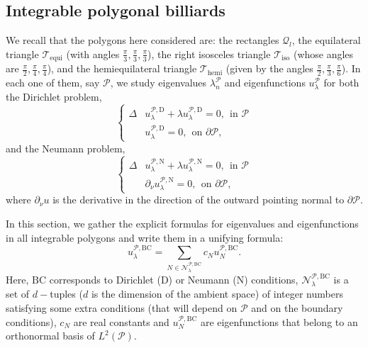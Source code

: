 \documentclass{amsart}
\theoremstyle{definition}
\theoremstyle{remark}
\newcommand{\pd}{\partial}
\numberwithin{equation}{section}
\theoremstyle{definition}
\theoremstyle{remark}
\begin{document}
\subsection{Integrable polygonal billiards}
We recall that the polygons here considered are: the rectangles $\mathcal{Q}_l$, the equilateral triangle $\mathcal{T}_{\mathrm{equi}}$ (with angles $\frac{\pi}{3},\frac{\pi}{3},\frac{\pi}{3}$), the right isosceles triangle $\mathcal{T}_\mathrm{iso}$ (whose angles are $\frac{\pi}{2},\frac{\pi}{4},\frac{\pi}{4}$), and the hemiequilateral triangle $\mathcal{T}_\mathrm{hemi}$ (given by the angles $\frac{\pi}{2},\frac{\pi}{3},\frac{\pi}{6}$). In each one of them, say $\mathcal{P}$, we study eigenvalues $	\lambda_n^\mathcal{P}$ and eigenfunctions $u_\lambda^\mathcal{P}$ for both the Dirichlet problem, \begin{equation}
	\left\{	\begin{aligned}
		\Delta &u_\lambda^{\mathcal{P},\mathrm{D}}+\lambda u_\lambda^{\mathcal{P},\mathrm{D}}=0, \ \ \text{in } \mathcal{P}\\
		&u_\lambda^{\mathcal{P},\mathrm{D}}=0,\ \ \text{on } \partial \mathcal{P},
	\end{aligned}\right.
\end{equation} and the Neumann problem,
\begin{equation}
	\left\{	\begin{aligned}
		\Delta &u_\lambda^{\mathcal{P},\mathrm{N}}+\lambda u_\lambda^{\mathcal{P},\mathrm{N}}=0, \ \ \text{in } \mathcal{P}\\
		&\partial_\nu u_\lambda^{\mathcal{P},\mathrm{N}}=0,\ \ \text{on } \partial \mathcal{P},
	\end{aligned}\right. 
\end{equation}
where $\pd_\nu u$ is the derivative in the direction of the outward pointing normal to $\partial\mathcal{P}$.

In this section, we gather the explicit formulas for eigenvalues and eigenfunctions in all integrable polygons and write them in a unifying formula: 
\begin{equation}
	u_\lambda^{\mathcal{P},\mathrm{BC}}=\sum_{N\in\mathcal{N}_\lambda^{\mathcal{P},\mathrm{BC}}}c_Nu_N^{\mathcal{P},\mathrm{BC}}.
\end{equation}
Here, $\mathrm{BC}$ corresponds to Dirichlet ($\mathrm{D}$) or Neumann ($\mathrm{N}$) conditions, $\mathcal{N}_\lambda^{\mathcal{P},\mathrm{BC}}$ is a set of $d-$tuples ($d$ is the dimension of the ambient space) of integer numbers satisfying some extra conditions (that will depend on $\mathcal{P}$ and on the boundary conditions), $c_N$ are real constants and $u_N^{\mathcal{P},\mathrm{BC}}$ are eigenfunctions that belong to an orthonormal basis of $L^2(\mathcal{P})$.
\end{document}
